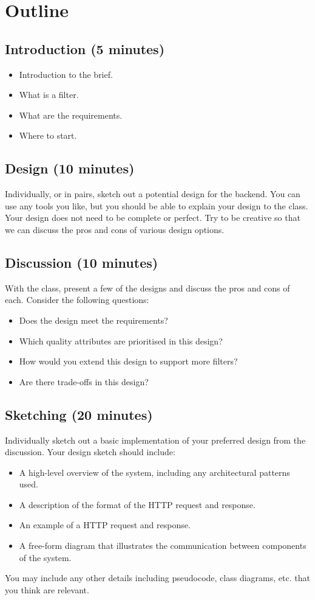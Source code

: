 \documentclass{csse4400}
\begin{document}
\section{Outline}

\subsection*{Introduction (5 minutes)}
\begin{itemize}[topsep=5pt,partopsep=2pt,itemsep=2pt,parsep=2pt]
    \item Introduction to the brief.
    \item What is a filter.
    \item What are the requirements.
    \item Where to start.
\end{itemize}

\subsection*{Design (10 minutes)}
Individually, or in pairs, sketch out a potential design for the backend.
You can use any tools you like, but you should be able to explain your design to the class.
Your design does not need to be complete or perfect.
Try to be creative so that we can discuss the pros and cons of various design options.

\subsection*{Discussion (10 minutes)}
With the class, present a few of the designs and discuss the pros and cons of each.
Consider the following questions:
\begin{itemize}
    \item Does the design meet the requirements?
    \item Which quality attributes are prioritised in this design?
    \item How would you extend this design to support more filters?
    \item Are there trade-offs in this design?
\end{itemize}

\subsection*{Sketching (20 minutes)}
Individually sketch out a basic implementation of your preferred design from the discussion.
Your design sketch should include:
\begin{itemize}
    \item A high-level overview of the system, including any architectural patterns used.
    \item A description of the format of the HTTP request and response.
    \item An example of a HTTP request and response.
    \item A free-form diagram that illustrates the communication between components of the system.
\end{itemize}
You may include any other details including pseudocode, class diagrams, etc. that you think are relevant.
\end{document}
